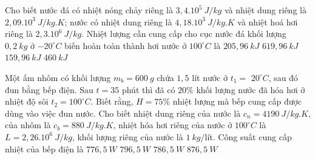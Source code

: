 \begin{vidu}
	 Cho biết nước đá có nhiệt nóng chảy riêng là $3,4.10^{5}\ J/kg$ và nhiệt dung riêng là $2,09.10^3\ J / kg. K$; nước có nhiệt dung riêng là $4,18.10^3\ J/kg.K$ và nhiệt hoá hơi riêng là $2,3.10^{6}\ J/kg$. Nhiệt lượng cần cung cấp cho cục nước đá khối lượng $0,2\ kg$ ở $-20^\circ C$ biến hoàn toàn thành hơi nước ở $100^\circ C$ là
	\choice
	{$205,96 \ kJ$}
	{\True $619,96 \ kJ$}
	{$159,96 \ kJ$}
	{$460 \ kJ$}
	\end{vidu}
\begin{vidu}
	Một ấm nhôm có khối lượng $m_{b}=600\ g$ chứa $1,5$ lít nước ở $t_1=$ $20^\circ C$, sau đó đun bằng bếp điện. Sau $t=35$ phút thì đã có $20 \%$ khối lượng nước đã hóa hơi ở nhiệt độ sôi $t_2=100^\circ C$. Biết rằng, $H=75 \%$ nhiệt lượng mà bếp cung cấp được dùng vào việc đun nước. Cho biết nhiệt dung riêng của nước là $c_{n}=4190\ J / kg . K$, của nhôm là $c_{b}=880\ J / kg . K$, nhiệt hóa hơi riêng của nước ở $100^\circ C$ là $L=2,26.10^{6}\ J/kg$, khối lượng riêng của nước là $1\ kg /$lít. Công suất cung cấp nhiệt của bếp điện là
	\choice
	{\True $776,5\ W$}
	{$796,5\ W$}
	{$786,5\ W$}
	{$876,5\ W$}
	\end{vidu}

